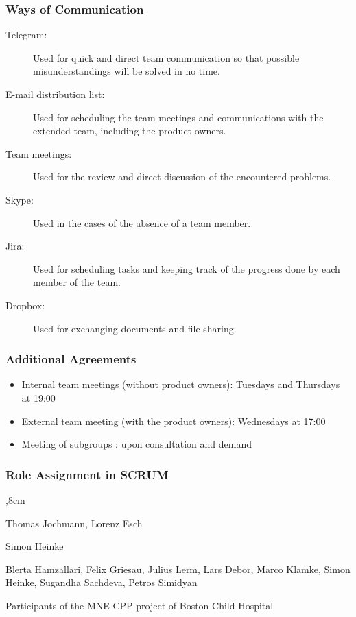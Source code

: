 \subsubsection{Ways of Communication}
\begin{description}
	\item[Telegram:] Used for quick and direct team communication so that possible misunderstandings will be solved in no time.
	
	\item[E-mail distribution list:] Used for scheduling the team meetings and communications with the extended team, including the product owners. 
	
	\item[Team meetings:] Used for the review and direct discussion of the encountered problems. 
	
	\item[Skype:] Used in the cases of the absence of a team member. 
	
	\item [Jira:] Used for scheduling tasks and keeping track of the progress done by each member of the team.
	
	\item[Dropbox:] Used for exchanging documents and file sharing.  
\end{description}

\subsubsection{Additional Agreements}
\begin{itemize}
	\item Internal team meetings (without product owners): Tuesdays and Thursdays at 19:00
	
	\item External team meeting (with the product owners): Wednesdays at 17:00
	
	\item Meeting of subgroups : upon consultation and demand 
\end{itemize}

\subsubsection{Role Assignment in SCRUM}

\begin{description}
	,8cm
	\item[Produkt Owner:] Thomas Jochmann, Lorenz Esch
	
	\item[Scrum Master:] Simon Heinke
	
	\item[Development team:] Blerta Hamzallari, Felix Griesau, Julius Lerm, Lars Debor, Marco Klamke, Simon Heinke, Sugandha Sachdeva, Petros Simidyan
	
	\item[Client, User:] Participants of the MNE CPP project of Boston Child Hospital
	
\end{description}

